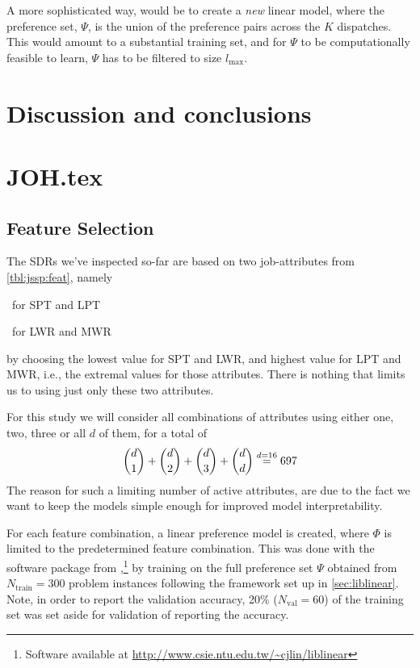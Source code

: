 A more sophisticated way, would be to create a \emph{new} linear model, where 
the preference set, $\Psi$, is the union of the preference pairs across the $K$ 
dispatches. This would amount to a substantial training set, and for $\Psi$ to 
be computationally feasible to learn, $\Psi$ has to be filtered to size 
$l_{\max}$.


\section{Discussion and conclusions}



\section{JOH.tex}

\subsection{Feature Selection}
The SDRs we've inspected so-far are based on two job-attributes from
\cref{tbl:jssp:feat}, namely
\begin{enumerate*}[after={{,}}]
  \item \phiproc\ for SPT and LPT 
  \item \phijobWrm\ for LWR and MWR 
\end{enumerate*}
by choosing the lowest value for SPT and LWR, and highest value for LPT and 
MWR, i.e., the extremal values for those attributes. 
There is nothing that limits us to using just only these two attributes. 

For this study we will consider all combinations of attributes using either one,
two, three or all $d$ of them, for a total of
\begin{equation}
{d \choose 1}+{d \choose 2}+{d \choose 3}+{d \choose d} 
\stackrel{d=16}{=} 697
\end{equation}
The reason for such a limiting number of active attributes,
are due to the fact we want to keep the models simple enough for improved model
interpretability.

For each feature combination, a linear preference model is created, where 
$\Phi$ is limited to the predetermined feature combination. 
This was done with the software package from
\cite{liblinear},\footnote{Software available at
  \url{http://www.csie.ntu.edu.tw/~cjlin/liblinear}}
by training on the full preference set $\Psi$ obtained from 
\mbox{$N_{\text{train}}=300$} problem instances following the framework set up 
in \cref{sec:liblinear}. 
Note, in order to report the validation accuracy, 20\% ($N_{\text{val}}=60$) of 
the training set was set aside for validation of reporting the accuracy.

